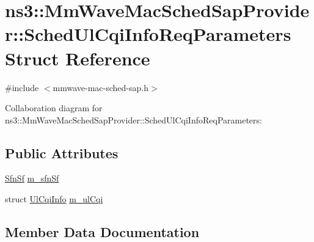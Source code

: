 \hypertarget{structns3_1_1MmWaveMacSchedSapProvider_1_1SchedUlCqiInfoReqParameters}{}\section{ns3\+:\+:Mm\+Wave\+Mac\+Sched\+Sap\+Provider\+:\+:Sched\+Ul\+Cqi\+Info\+Req\+Parameters Struct Reference}
\label{structns3_1_1MmWaveMacSchedSapProvider_1_1SchedUlCqiInfoReqParameters}


{\ttfamily \#include $<$mmwave-\/mac-\/sched-\/sap.\+h$>$}



Collaboration diagram for ns3\+:\+:Mm\+Wave\+Mac\+Sched\+Sap\+Provider\+:\+:Sched\+Ul\+Cqi\+Info\+Req\+Parameters\+:
\subsection*{Public Attributes}
\begin{DoxyCompactItemize}
\item 
\hyperlink{structns3_1_1SfnSf}{Sfn\+Sf} \hyperlink{structns3_1_1MmWaveMacSchedSapProvider_1_1SchedUlCqiInfoReqParameters_aa9703cc72148cf9fe96838c6034c91dc}{m\+\_\+sfn\+Sf}
\item 
struct \hyperlink{structns3_1_1UlCqiInfo}{Ul\+Cqi\+Info} \hyperlink{structns3_1_1MmWaveMacSchedSapProvider_1_1SchedUlCqiInfoReqParameters_ada0a21dc0e8ab004d54346e31c922ed1}{m\+\_\+ul\+Cqi}
\end{DoxyCompactItemize}


\subsection{Member Data Documentation}
